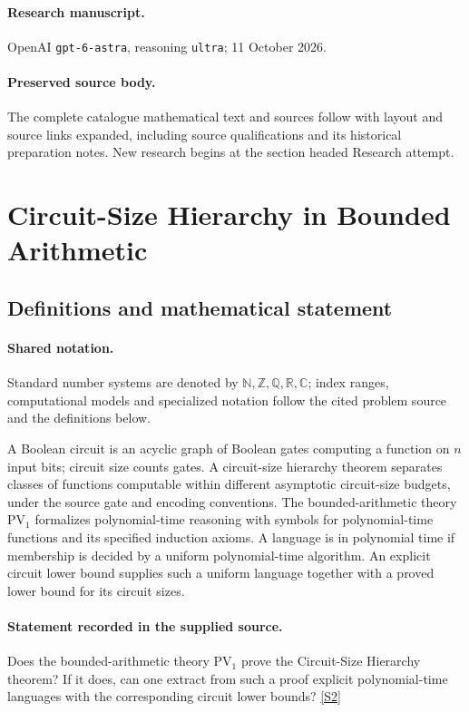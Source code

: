 \documentclass[11pt]{article}
\begin{document}
\paragraph{Research manuscript.} OpenAI \texttt{gpt-6-astra}, reasoning \texttt{ultra}; 11 October 2026.
\paragraph{Preserved source body.} The complete catalogue mathematical text and sources follow with layout and source links expanded, including source qualifications and its historical preparation notes. New research begins at the section headed Research attempt.

\section{Circuit-Size Hierarchy in Bounded Arithmetic}\label{statement}

\subsection{Definitions and mathematical statement}

\paragraph{Shared notation.}Standard number systems are denoted by $\mathbb N,\mathbb Z,\mathbb Q,\mathbb R,\mathbb C$; index ranges, computational models and specialized notation follow the cited problem source and the definitions below.


A Boolean circuit is an acyclic graph of Boolean gates computing a function on $n$ input bits; circuit size counts gates. A circuit-size hierarchy theorem separates classes of functions computable within different asymptotic circuit-size budgets, under the source gate and encoding conventions. The bounded-arithmetic theory $\mathrm{PV}_1$ formalizes polynomial-time reasoning with symbols for polynomial-time functions and its specified induction axioms. A language is in polynomial time if membership is decided by a uniform polynomial-time algorithm. An explicit circuit lower bound supplies such a uniform language together with a proved lower bound for its circuit sizes.
\paragraph{Statement recorded in the supplied source.}
Does the bounded-arithmetic theory $\mathrm{PV}_1$ prove the Circuit-Size Hierarchy theorem? If it does, can one extract from such a proof explicit polynomial-time languages with the corresponding circuit lower bounds? \href{https://doi.org/10.4171/owr/2024/15}{[S2]}
\end{document}
